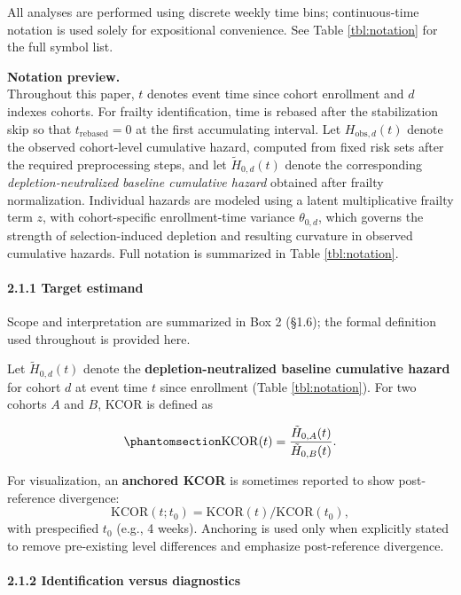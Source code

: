 \documentclass[
]{article}
\begin{document}
All analyses are performed using discrete weekly time bins;
continuous-time notation is used solely for expositional convenience.
See Table \ref{tbl:notation} for the full symbol list.

\textbf{Notation preview.}\\
Throughout this paper, \(t\) denotes event time since cohort enrollment
and \(d\) indexes cohorts. For frailty identification, time is rebased
after the stabilization skip so that \(t_{\mathrm{rebased}}=0\) at the
first accumulating interval. Let \(H_{\mathrm{obs},d}(t)\) denote the
observed cohort-level cumulative hazard, computed from fixed risk sets
after the required preprocessing steps, and let \(\tilde H_{0,d}(t)\)
denote the corresponding \emph{depletion-neutralized baseline cumulative
hazard} obtained after frailty normalization. Individual hazards are
modeled using a latent multiplicative frailty term \(z\), with
cohort-specific enrollment-time variance \(\theta_{0,d}\), which governs
the strength of selection-induced depletion and resulting curvature in
observed cumulative hazards. Full notation is summarized in Table
\ref{tbl:notation}.

\paragraph{2.1.1 Target estimand}\label{target-estimand}

Scope and interpretation are summarized in Box 2 (§1.6); the formal
definition used throughout is provided here.

Let \(\tilde H_{0,d}(t)\) denote the \textbf{depletion-neutralized
baseline cumulative hazard} for cohort \(d\) at event time \(t\) since
enrollment (Table \ref{tbl:notation}). For two cohorts \(A\) and \(B\),
KCOR is defined as

\begin{equation}\protect\phantomsection\label{eq:kcor-estimand}{
\mathrm{KCOR}(t) = \frac{\tilde H_{0,A}(t)}{\tilde H_{0,B}(t)}.
}\end{equation}

For visualization, an \textbf{anchored KCOR} is sometimes reported to
show post-reference divergence: \[
\mathrm{KCOR}(t; t_0) = \mathrm{KCOR}(t)/\mathrm{KCOR}(t_0),
\] with prespecified \(t_0\) (e.g., 4 weeks). Anchoring is used only
when explicitly stated to remove pre-existing level differences and
emphasize post-reference divergence.

\paragraph{2.1.2 Identification versus
diagnostics}\label{identification-versus-diagnostics}
\end{document}
